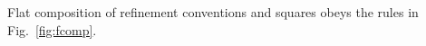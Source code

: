 \documentclass[acmsmall,nonacm]{acmart}
\newcommand{\ifr}[1]{\mathrel{[{#1}]}}
\begin{document}
\begin{theorem}%
Flat composition of refinement conventions and squares
obeys the rules in Fig.~\ref{fig:fcomp}.
\end{theorem}


%
%
%
\end{document}
